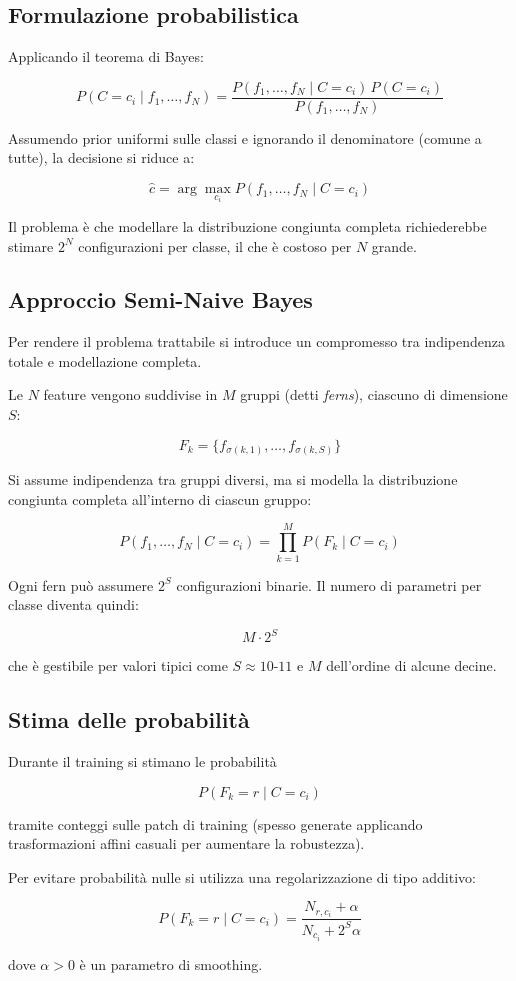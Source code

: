 \subsection{Formulazione probabilistica}

Applicando il teorema di Bayes:

\[
P(C = c_i \mid f_1, \dots, f_N)
=
\frac{
P(f_1, \dots, f_N \mid C = c_i)\, P(C = c_i)
}{
P(f_1, \dots, f_N)
}
\]

Assumendo prior uniformi sulle classi e ignorando il denominatore (comune a tutte), la decisione si riduce a:

\[
\hat{c} = \arg\max_{c_i} P(f_1, \dots, f_N \mid C = c_i)
\]

Il problema è che modellare la distribuzione congiunta completa richiederebbe stimare $2^N$ configurazioni per classe, il che è costoso per $N$ grande.

\subsection{Approccio Semi-Naive Bayes}

Per rendere il problema trattabile si introduce un compromesso tra indipendenza totale e modellazione completa.

Le $N$ feature vengono suddivise in $M$ gruppi (detti \emph{ferns}), ciascuno di dimensione $S$:

\[
F_k = \{ f_{\sigma(k,1)}, \dots, f_{\sigma(k,S)} \}
\]

Si assume indipendenza tra gruppi diversi, ma si modella la distribuzione congiunta completa all’interno di ciascun gruppo:

\[
P(f_1, \dots, f_N \mid C=c_i)
=
\prod_{k=1}^{M}
P(F_k \mid C=c_i)
\]

Ogni fern può assumere $2^S$ configurazioni binarie. 
Il numero di parametri per classe diventa quindi:

\[
M \cdot 2^S
\]

che è gestibile per valori tipici come $S \approx 10$-$11$ e $M$ dell’ordine di alcune decine.

\subsection{Stima delle probabilità}

Durante il training si stimano le probabilità

\[
P(F_k = r \mid C=c_i)
\]

tramite conteggi sulle patch di training (spesso generate applicando trasformazioni affini casuali per aumentare la robustezza).

Per evitare probabilità nulle si utilizza una regolarizzazione di tipo additivo:

\[
P(F_k = r \mid C=c_i)
=
\frac{N_{r,c_i} + \alpha}
     {N_{c_i} + 2^S \alpha}
\]

dove $\alpha > 0$ è un parametro di smoothing.
